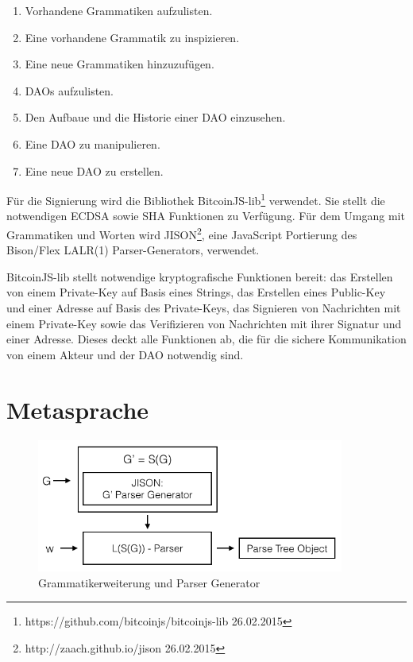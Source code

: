 \documentclass[a4paper,12pt]{report}
\begin{document}
\begin{enumerate}
  \item Vorhandene Grammatiken aufzulisten.
  \item Eine vorhandene Grammatik zu inspizieren.
  \item Eine neue Grammatiken hinzuzufügen.
  \item DAOs aufzulisten.
  \item Den Aufbaue und die Historie einer DAO einzusehen.
  \item Eine DAO zu manipulieren.
  \item Eine neue DAO zu erstellen.
\end{enumerate}

Für die Signierung wird die Bibliothek BitcoinJS-lib\footnote{https://github.com/bitcoinjs/bitcoinjs-lib 26.02.2015} verwendet. Sie stellt die notwendigen ECDSA sowie SHA Funktionen zu Verfügung. Für dem Umgang mit Grammatiken und Worten wird JISON\footnote{http://zaach.github.io/jison 26.02.2015}, eine JavaScript Portierung des Bison/Flex LALR(1) Parser-Generators, verwendet.

BitcoinJS-lib stellt notwendige kryptografische Funktionen bereit: das Erstellen von einem Private-Key auf Basis eines Strings, das Erstellen eines Public-Key und einer Adresse auf Basis des Private-Keys, das Signieren von Nachrichten mit einem Private-Key sowie das Verifizieren von Nachrichten mit ihrer Signatur und einer Adresse. Dieses deckt alle Funktionen ab, die für die sichere Kommunikation von einem Akteur und der DAO notwendig sind.

\section{Metasprache}
\label{metalang}
\begin{figure}[ht]
    \centering
    \includegraphics[width=0.90\textwidth]{bilder/parsergenerator.png}
    \caption{Grammatikerweiterung und Parser Generator}
\end{figure}
\end{document}
